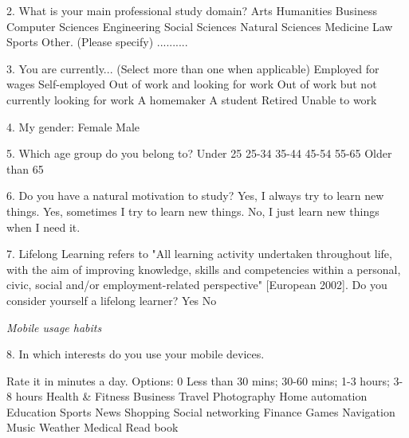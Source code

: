 \begin{small}
2. What is your main professional study domain?
\hfill \break {}  Arts
\hfill \break {}  Humanities
\hfill \break {}  Business
\hfill \break {}  Computer Sciences
\hfill \break {}  Engineering
\hfill \break {}  Social Sciences
\hfill \break {}  Natural Sciences
\hfill \break {}  Medicine
\hfill \break {}  Law
\hfill \break {}  Sports
\hfill \break {}  Other. (Please specify) ..........

3. You are currently... (Select more than one when applicable)
\hfill \break {}  Employed for wages
\hfill \break {}  Self-employed
\hfill \break {}  Out of work and looking for work
\hfill \break {}  Out of work but not currently looking for work
\hfill \break {}  A homemaker
\hfill \break {}  A student
\hfill \break {}  Retired
\hfill \break {}  Unable to work

4. My gender:
\hfill \break {}  Female
\hfill \break {}  Male

5. Which age group do you belong to?
\hfill \break {}  Under 25
\hfill \break {}  25-34
\hfill \break {}  35-44
\hfill \break {}  45-54
\hfill \break {}  55-65
\hfill \break {}  Older than 65

6. Do you have a natural motivation to study?
\hfill \break {}  Yes, I always try to learn new things.
\hfill \break {}  Yes, sometimes I try to learn new things.
\hfill \break {}  No, I just learn new things when I need it.

7.  Lifelong Learning refers to "All learning activity undertaken throughout life, with the aim of improving knowledge, skills and competencies within a personal, civic, social and/or employment-related perspective" [European 2002]. Do you consider yourself a lifelong learner?
\hfill \break {}  Yes
\hfill \break {}  No

\textit{Mobile usage habits}

8. In which interests do you use your mobile devices. 

Rate it in minutes a day. Options: 0 Less than 30 mins; 30-60 mins; 1-3 hours; 3-8 hours
\hfill \break {}  Health \& Fitness
\hfill \break {}  Business					
\hfill \break {}  Travel					
\hfill \break {}  Photography					
\hfill \break {}  Home automation					
\hfill \break {}  Education					
\hfill \break {}  Sports					
\hfill \break {}  News					
\hfill \break {}  Shopping					
\hfill \break {}  Social networking					
\hfill \break {}  Finance					
\hfill \break {}  Games					
\hfill \break {}  Navigation					
\hfill \break {}  Music					
\hfill \break {}  Weather					
\hfill \break {}  Medical					
\hfill \break {}  Read book					


\end{small}
